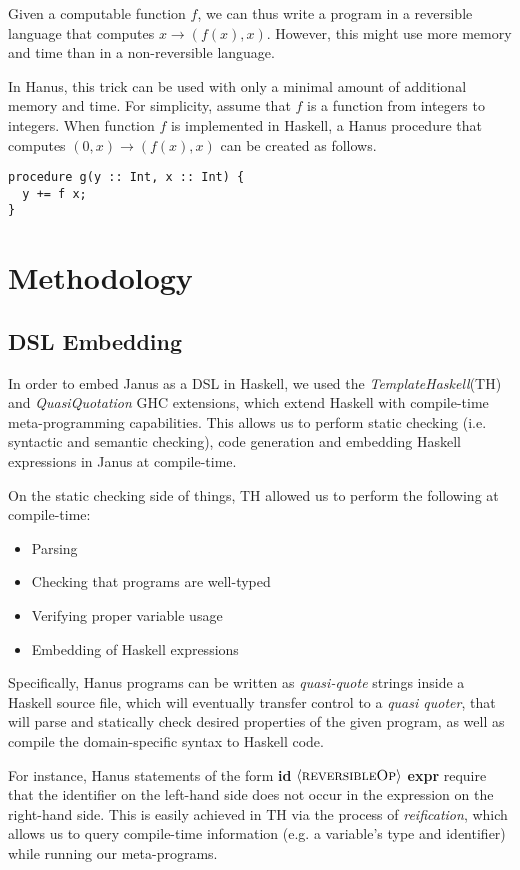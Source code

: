 \documentclass[12pt,a4paper]{article}
\begin{document}
Given a computable function $f$, we can thus write a program in a reversible language that computes $x \to (f(x), x)$. However, this might use more memory and time than in a non-reversible language.

In Hanus, this trick can be used with only a minimal amount of additional memory and time. For simplicity, assume that $f$ is a function from integers to integers. When function $f$ is implemented in Haskell, a Hanus procedure that computes $(0, x) \to (f(x), x)$ can be created as follows.

\begin{verbatim}
procedure g(y :: Int, x :: Int) {
  y += f x;
}
\end{verbatim}

\section{Methodology}
\label{section:methodology}
\subsection{DSL Embedding}
\label{subsec:template-haskell}
In order to embed Janus as a DSL in Haskell, we used the \textit{TemplateHaskell}(TH)\cite{sheard02} and \textit{QuasiQuotation}\cite{mainland07} GHC extensions, which extend Haskell with compile-time meta-programming capabilities. This allows us to perform static checking (i.e. syntactic and semantic checking), code generation and embedding Haskell expressions in Janus at compile-time.

On the static checking side of things, TH allowed us to perform the following at compile-time:
\begin{itemize}
    \item{Parsing}
    \item{Checking that programs are well-typed}
    \item{Verifying proper variable usage}
    \item{Embedding of Haskell expressions}
\end{itemize}

Specifically, Hanus programs can be written as \textit{quasi-quote} strings inside a Haskell source file, which will eventually transfer control to a \textit{quasi quoter}, that will parse and statically check desired properties of the given program, as well as compile the domain-specific syntax to Haskell code.

For instance, Hanus statements of the form \textbf{id} $\langle\textsc{reversibleOp}\rangle$ \textbf{expr} require that the identifier on the left-hand side does not occur in the expression on the right-hand side. This is easily achieved in TH via the process of \textit{reification}, which allows us to query compile-time information (e.g. a variable's type and identifier) while running our meta-programs.
\end{document}
